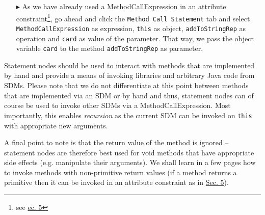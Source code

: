 \begin{itemize}
\item[$\blacktriangleright$] As we have already used a MethodCallExpression in an attribute constraint\footnote{see \hyperlink{sec:growBox}{ec. 5}}, go ahead
and click the \texttt{Method Call Statement} tab and select \texttt{MethodCallExpression} as expression, \texttt{this} as object, \texttt{addToStringRep} as
operation and \texttt{card} as value of the parameter. That way, we pass the object variable \texttt{card} to the method \texttt{addToStringRep} as parameter.

\end{itemize}

Statement nodes should be used to interact with methods that are implemented by hand and provide a means of invoking libraries and arbitrary Java code from
SDMs. Please note that we do not differentiate at this point between methods that are implemented via an SDM or by hand and thus, statement nodes can of course
be used to invoke other SDMs via a MethodCallExpression. Most importantly, this enables \emph{recursion} as the current SDM can be invoked on \texttt{this} with
appropriate new arguments.

A final point to note is that the return value of the method is ignored -- statement nodes are therefore best used for void methods that have appropriate
side effects (e.g. manipulate their arguments). We shall learn in a few pages how to invoke methods with non-primitive return values (if a method returns a
primitive then it can be invoked in an attribute constraint as in \hyperlink{sec:growBox}{Sec. 5}). %



\begin{figure}[htbp]
   \centering
      \qquad
      \caption{}
\end{figure}
\FloatBarrier

